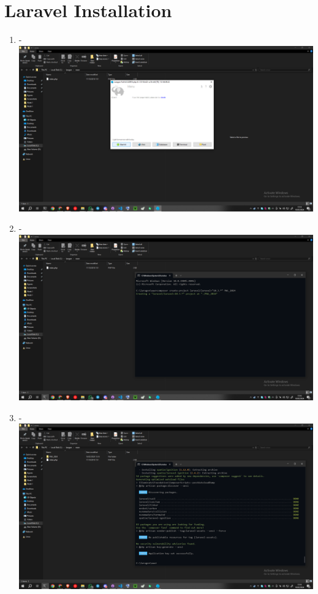 \documentclass[12pt,titlepage]{article}
\begin{document}
\section{Laravel Installation}

\begin{enumerate}[label= \alph*.]
    \item - \\ \includegraphics[width=.9\textwidth]{images/figures/Laraval Init 1.png}
    \item - \\ \includegraphics[width=.9\textwidth]{images/figures/Laraval Init 2.png}
    \newpage
    \item - \\ \includegraphics[width=.9\textwidth]{images/figures/Laraval Init 3.png}

\end{enumerate}
\end{document}
